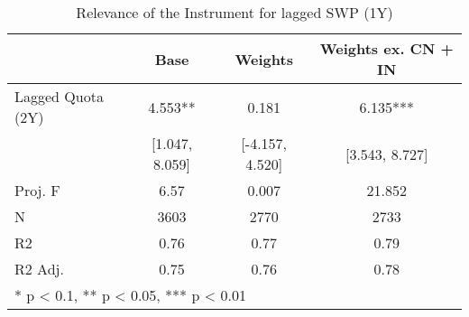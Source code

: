 \begin{table}
\tablefont
\caption{Relevance of the Instrument for lagged SWP (1Y)\label{tab:iv_rel}}
\centering
\begin{tabular}[t]{lccc}
\toprule
  & Base & Weights & Weights ex. CN + IN\\
\midrule
Lagged Quota (2Y) & 4.553** & 0.181 & 6.135***\\
 & [1.047, 8.059] & [-4.157, 4.520] & [3.543, 8.727]\\
\midrule
Proj. F & 6.57 & 0.007 & 21.852\\
N & 3603 & 2770 & 2733\\
R2 & 0.76 & 0.77 & 0.79\\
R2 Adj. & 0.75 & 0.76 & 0.78\\
\bottomrule
\multicolumn{4}{l}{\textsuperscript{} * p < 0.1, ** p < 0.05, *** p < 0.01}\\
\end{tabular}
\end{table}
